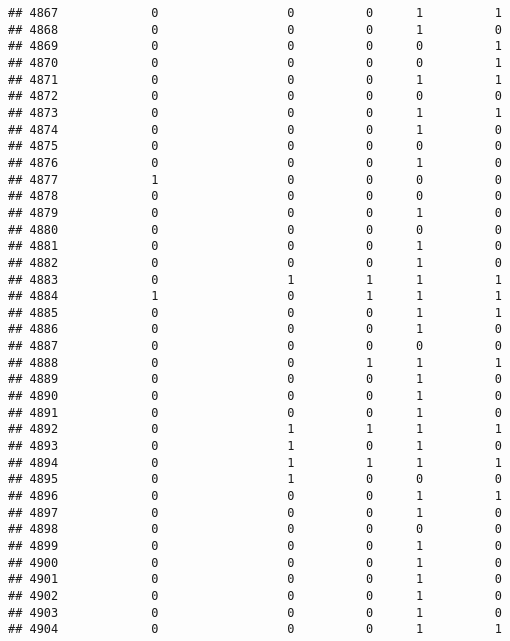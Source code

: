\documentclass[
]{article}
\begin{document}
\begin{verbatim}
## 4867             0                  0          0      1          1
## 4868             0                  0          0      1          0
## 4869             0                  0          0      0          1
## 4870             0                  0          0      0          1
## 4871             0                  0          0      1          1
## 4872             0                  0          0      0          0
## 4873             0                  0          0      1          1
## 4874             0                  0          0      1          0
## 4875             0                  0          0      0          0
## 4876             0                  0          0      1          0
## 4877             1                  0          0      0          0
## 4878             0                  0          0      0          0
## 4879             0                  0          0      1          0
## 4880             0                  0          0      0          0
## 4881             0                  0          0      1          0
## 4882             0                  0          0      1          0
## 4883             0                  1          1      1          1
## 4884             1                  0          1      1          1
## 4885             0                  0          0      1          1
## 4886             0                  0          0      1          0
## 4887             0                  0          0      0          0
## 4888             0                  0          1      1          1
## 4889             0                  0          0      1          0
## 4890             0                  0          0      1          0
## 4891             0                  0          0      1          0
## 4892             0                  1          1      1          1
## 4893             0                  1          0      1          0
## 4894             0                  1          1      1          1
## 4895             0                  1          0      0          0
## 4896             0                  0          0      1          1
## 4897             0                  0          0      1          0
## 4898             0                  0          0      0          0
## 4899             0                  0          0      1          0
## 4900             0                  0          0      1          0
## 4901             0                  0          0      1          0
## 4902             0                  0          0      1          0
## 4903             0                  0          0      1          0
## 4904             0                  0          0      1          1

\end{verbatim}
\end{document}
